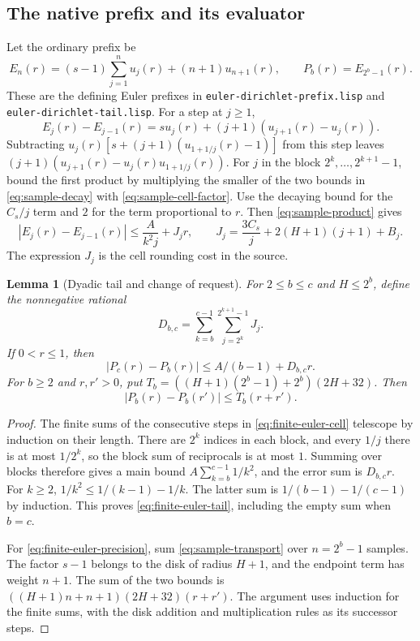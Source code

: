 \documentclass[11pt]{amsart}
\newtheorem{lemma}[theorem]{Lemma}
\theoremstyle{definition}
\theoremstyle{remark}
\numberwithin{equation}{section}
\newcommand{\code}[1]{\nolinkurl{#1}}
\begin{document}
\subsection{The native prefix and its evaluator}

Let the ordinary prefix be
\[
 E_n(r)=(s-1)\sum_{j=1}^n u_j(r)+(n+1)u_{n+1}(r),
 \qquad P_b(r)=E_{2^b-1}(r).
\]
These are the defining Euler prefixes in
\code{euler-dirichlet-prefix.lisp} and
\code{euler-dirichlet-tail.lisp}. For a step at $j\ge1$,
\[
 E_j(r)-E_{j-1}(r)=s u_j(r)+(j+1)(u_{j+1}(r)-u_j(r)).
\]
Subtracting $u_j(r)[s+(j+1)(u_{1+1/j}(r)-1)]$ from this
step leaves $(j+1)(u_{j+1}(r)-u_j(r)u_{1+1/j}(r))$.
For $j$ in the block $2^k,\ldots,2^{k+1}-1$, bound the
first product by multiplying the smaller of the two bounds
in \eqref{eq:sample-decay} with \eqref{eq:sample-cell-factor}.
Use the decaying bound for the $C_s/j$ term and $2$ for
the term proportional to $r$. Then \eqref{eq:sample-product}
gives
\begin{equation}\label{eq:finite-euler-cell}
 |E_j(r)-E_{j-1}(r)|\le \frac{A}{k^2j}+J_j r,\qquad
 J_j=\frac{3C_s}{j}+2(H+1)(j+1)+B_j.
\end{equation}
The expression $J_j$ is the cell rounding cost in the source.

\begin{lemma}[Dyadic tail and change of request]
\label{lem:dyadic-prefix}
For $2\le b\le c$ and $H\le2^b$, define the nonnegative
rational
\[
 D_{b,c}=\sum_{k=b}^{c-1}\sum_{j=2^k}^{2^{k+1}-1}J_j .
\]
If $0<r\le1$, then
\begin{equation}\label{eq:finite-euler-tail}
 |P_c(r)-P_b(r)|\le A/(b-1)+D_{b,c}r .
\end{equation}
For $b\ge2$ and $r,r'>0$, put
$T_b=((H+1)(2^b-1)+2^b)(2H+32)$. Then
\begin{equation}\label{eq:finite-euler-precision}
 |P_b(r)-P_b(r')|\le T_b(r+r').
\end{equation}
\end{lemma}
\begin{proof}
The finite sums of the consecutive steps in
\eqref{eq:finite-euler-cell} telescope by induction on their
length. There are $2^k$ indices in each block, and every
$1/j$ there is at most $1/2^k$, so the block sum of reciprocals
is at most $1$. Summing over blocks therefore gives a main bound
$A\sum_{k=b}^{c-1}1/k^2$, and the error sum is $D_{b,c}r$.
For $k\ge2$,
$1/k^2\le 1/(k-1)-1/k$. The latter sum is
$1/(b-1)-1/(c-1)$ by induction. This proves
\eqref{eq:finite-euler-tail}, including the empty sum when $b=c$.

For \eqref{eq:finite-euler-precision}, sum
\eqref{eq:sample-transport} over $n=2^b-1$ samples.
The factor $s-1$ belongs to the disk of radius $H+1$,
and the endpoint term has weight $n+1$. The sum of the
two bounds is $((H+1)n+n+1)(2H+32)(r+r')$.
The argument uses induction for the finite sums, with the
disk addition and multiplication rules as its successor steps.
\end{proof}
\end{document}
